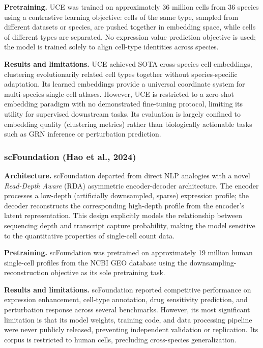 \textbf{Pretraining.} UCE was trained on approximately 36 million cells from 36 species using a
contrastive learning objective: cells of the same type, sampled from different datasets or species,
are pushed together in embedding space, while cells of different types are separated. No expression
value prediction objective is used; the model is trained solely to align cell-type identities
across species.

\textbf{Results and limitations.} UCE achieved \gls{SOTA} cross-species cell embeddings, clustering
evolutionarily related cell types together without species-specific adaptation. Its learned
embeddings provide a universal coordinate system for multi-species single-cell atlases. However, UCE is restricted to a zero-shot embedding paradigm with no demonstrated
fine-tuning protocol, limiting its utility for supervised downstream tasks. Its evaluation is largely
confined to embedding quality (clustering metrics) rather than biologically actionable tasks such
as \gls{GRN} inference or perturbation prediction.

\subsubsection{scFoundation (Hao et al., 2024)}
\textbf{Architecture.} scFoundation \cite{haoLargescaleFoundationModel2024} departed from direct
NLP analogies with a novel \emph{Read-Depth Aware} (RDA) asymmetric encoder-decoder architecture.
The encoder processes a low-depth (artificially downsampled, sparse) expression profile; the
decoder reconstructs the corresponding high-depth profile from the encoder's latent representation.
This design explicitly models the relationship between sequencing depth and transcript capture
probability, making the model sensitive to the quantitative properties of single-cell count data.

\textbf{Pretraining.} scFoundation was pretrained on approximately 19 million human single-cell
profiles from the NCBI \gls{GEO} database using the downsampling-reconstruction objective as its
sole pretraining task.

\textbf{Results and limitations.} scFoundation reported competitive performance on expression enhancement,
cell-type annotation, drug sensitivity prediction, and perturbation response across several
benchmarks. However, its most significant limitation is that its model weights,
training code, and data processing pipeline were never publicly released, preventing independent
validation or replication. Its corpus is restricted to human cells, precluding cross-species
generalization.

